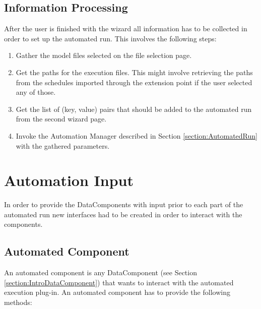 \subsection{Information Processing}
\label{section:InformationProcessing}
After the user is finished with the wizard all information has to be collected in order to set up the automated run.
This involves the following steps:
\begin{enumerate}
 \item Gather the model files selected on the file selection page.
 \item Get the paths for the execution files. This might involve retrieving the paths from the schedules imported through
the extension point if the user selected any of those.
 \item Get the list of (key, value) pairs that should be added to the automated run from the second wizard page.
 \item Invoke the Automation Manager described in Section \ref{section:AutomatedRun} with the gathered parameters.
\end{enumerate}


\section{Automation Input}
\label{section:AutoInput}
In order to provide the DataComponents with input prior to each part of the automated run new interfaces
had to be created in order to interact with the components. 

\subsection{Automated Component}
\label{section:AutomatedComponent}
An automated component is any DataComponent (see Section \ref{section:IntroDataComponent}) that wants to interact with
the automated execution plug-in. An automated component has to provide the following methods:

